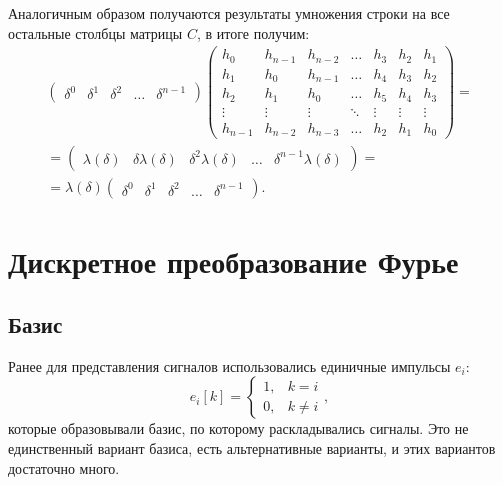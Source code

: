Аналогичным образом получаются результаты умножения строки на все остальные столбцы матрицы $C$, в итоге получим:
\begin{multline*}
    \begin{pmatrix}
        \delta^0 & \delta^1 & \delta^2 & \dots & \delta^{n-1}
    \end{pmatrix}
    \begin{pmatrix}
        h_0     & h_{n-1} & h_{n-2} & \dots  & h_3    & h_2    & h_1    \\
        h_1     & h_0     & h_{n-1} & \dots  & h_4    & h_3    & h_2    \\
        h_2     & h_1     & h_0     & \dots  & h_5    & h_4    & h_3    \\
        \vdots  & \vdots  & \vdots  & \ddots & \vdots & \vdots & \vdots \\
        h_{n-1} & h_{n-2} & h_{n-3} & \dots  & h_2    & h_1    & h_0
    \end{pmatrix} = \\
    = \begin{pmatrix}
        \lambda(\delta) & \delta \lambda(\delta) & \delta^2 \lambda(\delta) & \dots & \delta^{n-1} \lambda(\delta)
    \end{pmatrix} = \\
    = \lambda(\delta)
    \begin{pmatrix}
        \delta^0 & \delta^1 & \delta^2 & \dots & \delta^{n-1}
    \end{pmatrix}
    .
\end{multline*}


\section{Дискретное преобразование Фурье}

\subsection{Базис}

Ранее для представления сигналов использовались единичные импульсы $e_i$:
\[
    e_i[k]
    =
    \left\{
    \begin{array}{ll}
        1, & k = i    \\
        0, & k \neq i
    \end{array}
    \right.
    ,
\]
которые образовывали базис, по которому раскладывались сигналы. Это не единственный вариант базиса, есть альтернативные варианты, и этих вариантов достаточно много.

